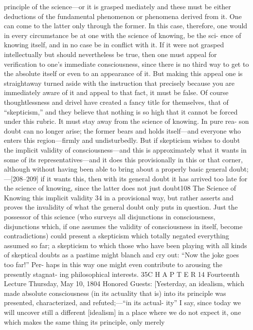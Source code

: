 principle of the science—or it is grasped mediately and these must be either
deductions of the fundamental phenomenon or phenomena derived from it.
One can come to the latter only through the former. In this case, therefore, one
would in every circumstance be at one with the science of knowing, be the sci-
ence of knowing itself, and in no case be in conflict with it. If it were not
grasped intellectually but should nevertheless be true, then one must appeal for
verification to one’s immediate consciousness, since there is no third way to get
to the absolute itself or even to an appearance of it. But making this appeal one
is straightaway turned aside with the instruction that precisely because you are
immediately aware of it and appeal to that fact, it must be false. Of course
thoughtlessness and drivel have created a fancy title for themselves, that of
“skepticism,” and they believe that nothing is so high that it cannot be forced
under this rubric. It must stay away from the science of knowing. In pure rea-
son doubt can no longer arise; the former bears and holds itself—and everyone
who enters this region—firmly and undisturbedly. But if skepticism wishes to
doubt the implicit validity of consciousness—and this is approximately what it
wants in some of its representatives—and it does this provisionally in this or
that corner, although without having been able to bring about a properly basic
general doubt;—[208–209] if it wants this, then with its general doubt it has
arrived too late for the science of knowing, since the latter does not just doubt108
The Science of Knowing
this implicit validity 34 in a provisional way, but rather asserts and proves the
invalidity of what the general doubt only puts in question. Just the possessor of
this science (who surveys all disjunctions in consciousness, disjunctions which,
if one assumes the validity of consciousness in itself, become contradictions)
could present a skepticism which totally negated everything assumed so far; a
skepticism to which those who have been playing with all kinds of skeptical
doubts as a pastime might blanch and cry out: “Now the joke goes too far!” Per-
haps in this way one might even contribute to arousing the presently stagnat-
ing philosophical interests. 35C H A P T E R
14
Fourteenth Lecture
Thursday, May 10, 1804
Honored Guests:
[Yesterday, an idealism, which made absolute consciousness (in its actuality that
is) into its principle was presented, characterized, and refuted;—“in its actual-
ity” I say, since today we will uncover still a different [idealism] in a place where
we do not expect it, one which makes the same thing its principle, only merely
